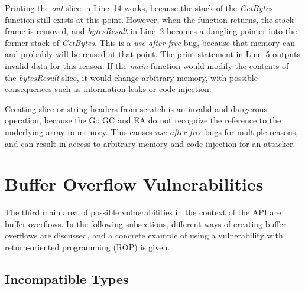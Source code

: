 Printing the \textit{out} slice in Line~14 works, because the stack of the \textit{GetBytes} function still exists at
this point.
However, when the function returns, the stack frame is removed, and \textit{bytesResult} in Line~2 becomes a dangling
pointer into the former stack of \textit{GetBytes}.
This is a \textit{use-after-free} bug, because that memory can and probably will be reused at that point.
The print statement in Line~5 outputs invalid data for this reason.
If the \textit{main} function would modify the contents of the \textit{bytesResult} slice, it would change arbitrary
memory, with possible consequences such as information leaks or code injection.

\begin{insight}
    Creating slice or string headers from scratch is an invalid and dangerous operation, because the Go \acrshort{GC}
    and \acrshort{EA} do not recognize the reference to the underlying array in memory.
    This causes \textit{use-after-free} bugs for multiple reasons, and can result in access to arbitrary memory and code
    injection for an attacker.
\end{insight}



\section{Buffer Overflow Vulnerabilities}\label{sec:unsafe-security-problems:buffer-overflow}

The third main area of possible vulnerabilities in the context of the \unsafe{} \acrshort{API} are buffer overflows.
In the following subsections, different ways of creating buffer overflows are discussed, and a concrete example of
using a vulnerability with return-oriented programming (\acrshort{ROP}) is given.



\subsection{Incompatible Types}\label{subsec:unsafe-security-problems:slice-casts:incompatible-types}

